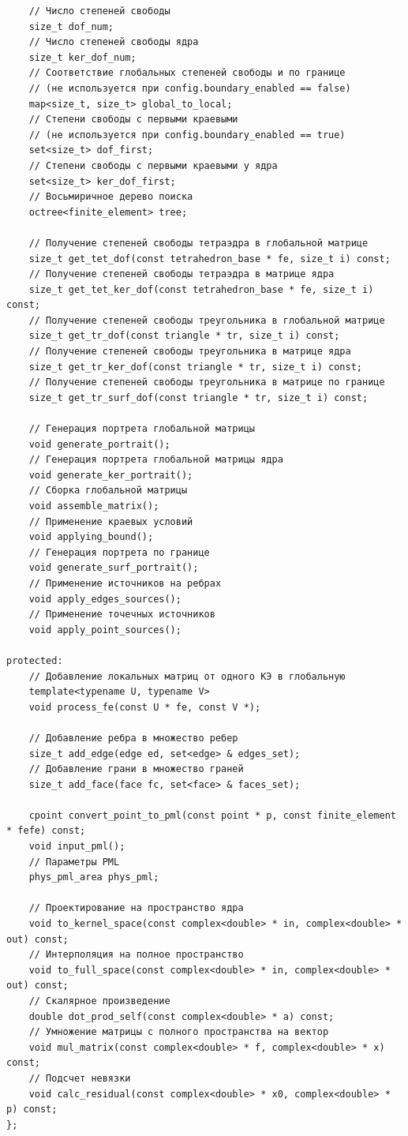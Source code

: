 \documentclass[a4paper,12pt]{article}
\begin{document}
\begin{singlespace}
\begin{tiny}
\begin{verbatim}
    // Число степеней свободы
    size_t dof_num;
    // Число степеней свободы ядра
    size_t ker_dof_num;
    // Соответствие глобальных степеней свободы и по границе
    // (не используется при config.boundary_enabled == false)
    map<size_t, size_t> global_to_local;
    // Степени свободы с первыми краевыми
    // (не используется при config.boundary_enabled == true)
    set<size_t> dof_first;
    // Степени свободы с первыми краевыми у ядра
    set<size_t> ker_dof_first;
    // Восьмиричное дерево поиска
    octree<finite_element> tree;

    // Получение степеней свободы тетраэдра в глобальной матрице
    size_t get_tet_dof(const tetrahedron_base * fe, size_t i) const;
    // Получение степеней свободы тетраэдра в матрице ядра
    size_t get_tet_ker_dof(const tetrahedron_base * fe, size_t i) const;
    // Получение степеней свободы треугольника в глобальной матрице
    size_t get_tr_dof(const triangle * tr, size_t i) const;
    // Получение степеней свободы треугольника в матрице ядра
    size_t get_tr_ker_dof(const triangle * tr, size_t i) const;
    // Получение степеней свободы треугольника в матрице по границе
    size_t get_tr_surf_dof(const triangle * tr, size_t i) const;

    // Генерация портрета глобальной матрицы
    void generate_portrait();
    // Генерация портрета глобальной матрицы ядра
    void generate_ker_portrait();
    // Сборка глобальной матрицы
    void assemble_matrix();
    // Применение краевых условий
    void applying_bound();
    // Генерация портрета по границе
    void generate_surf_portrait();
    // Применение источников на ребрах
    void apply_edges_sources();
    // Применение точечных источников
    void apply_point_sources();

protected:
    // Добавление локальных матриц от одного КЭ в глобальную
    template<typename U, typename V>
    void process_fe(const U * fe, const V *);

    // Добавление ребра в множество ребер
    size_t add_edge(edge ed, set<edge> & edges_set);
    // Добавление грани в множество граней
    size_t add_face(face fc, set<face> & faces_set);

    cpoint convert_point_to_pml(const point * p, const finite_element * fefe) const;
    void input_pml();
    // Параметры PML
    phys_pml_area phys_pml;

    // Проектирование на пространство ядра
    void to_kernel_space(const complex<double> * in, complex<double> * out) const;
    // Интерполяция на полное пространство
    void to_full_space(const complex<double> * in, complex<double> * out) const;
    // Скалярное произведение
    double dot_prod_self(const complex<double> * a) const;
    // Умножение матрицы с полного пространства на вектор
    void mul_matrix(const complex<double> * f, complex<double> * x) const;
    // Подсчет невязки
    void calc_residual(const complex<double> * x0, complex<double> * p) const;
};


\end{verbatim}
\end{tiny}
\end{singlespace}
\end{document}
